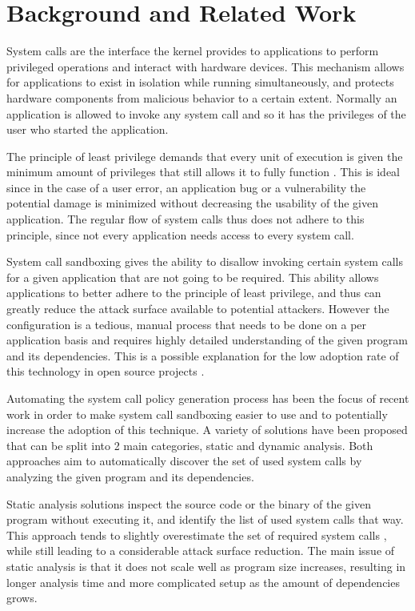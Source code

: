 \section{Background and Related Work}
\label{sec:background}
System calls are the interface the kernel provides to applications to perform privileged operations and interact with hardware devices. This mechanism allows for applications to exist in isolation while running simultaneously, and protects hardware components from malicious behavior to a certain extent. Normally an application is allowed to invoke any system call and so it has the privileges of the user who started the application.

The principle of least privilege demands that every unit of execution is given the minimum amount of privileges that still allows it to fully function \cite{ref_plp_1}. This is ideal since in the case of a user error, an application bug or a vulnerability the potential damage is minimized without decreasing the usability of the given application. The regular flow of system calls thus does not adhere to this principle, since not every application needs access to every system call.

System call sandboxing gives the ability to disallow invoking certain system calls for a given application that are not going to be required. This ability allows applications to better adhere to the principle of least privilege, and thus can greatly reduce the attack surface available to potential attackers. However the configuration is a tedious, manual process that needs to be done on a per application basis and requires highly detailed understanding of the given program and its dependencies. This is a possible explanation for the low adoption rate of this technology in open source projects \cite{ref_adoption_1}.

Automating the system call policy generation process has been the focus of recent work in order to make system call sandboxing easier to use and to potentially increase the adoption of this technique. A variety of solutions have been proposed that can be split into 2 main categories, static and dynamic analysis. Both approaches aim to automatically discover the set of used system calls by analyzing the given program and its dependencies.

Static analysis solutions \cite{ref_sp_1,ref_sp_3,ref_sp_2} inspect the source code or the binary of the given program without executing it, and identify the list of used system calls that way. This approach tends to slightly overestimate the set of required system calls \cite{ref_dyn_1}, while still leading to a considerable attack surface reduction. The main issue of static analysis is that it does not scale well as program size increases, resulting in longer analysis time and more complicated setup as the amount of dependencies grows.

